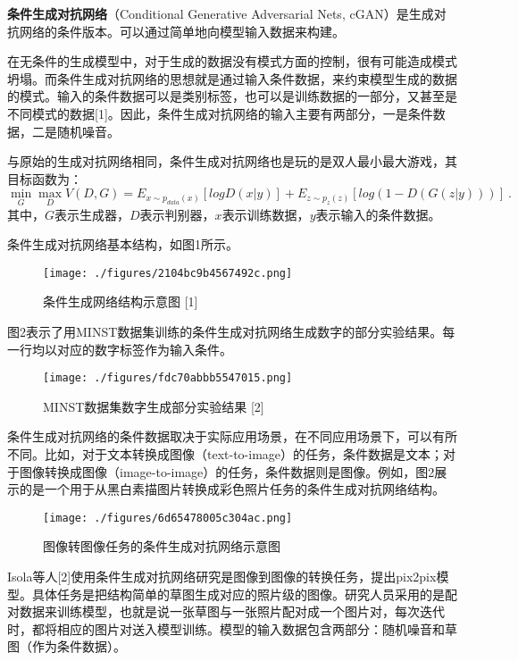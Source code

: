 

\textbf{条件生成对抗网络}（Conditional Generative Adversarial Nets, cGAN）是生成对抗网络的条件版本。可以通过简单地向模型输入数据来构建。

在无条件的生成模型中，对于生成的数据没有模式方面的控制，很有可能造成模式坍塌。而条件生成对抗网络的思想就是通过输入条件数据，来约束模型生成的数据的模式。输入的条件数据可以是类别标签，也可以是训练数据的一部分，又甚至是不同模式的数据[1]。因此，条件生成对抗网络的输入主要有两部分，一是条件数据，二是随机噪音。

与原始的生成对抗网络相同，条件生成对抗网络也是玩的是双人最小最大游戏，其目标函数为：
\begin{equation}
\mathop{\min}\limits_G \mathop {\max }\limits_D V(D,G)=E_{x\sim p_{data}(x)}[logD(x|y)]+E_{z\sim p_z(z)}[log(1-D(G(z|y)))]~.
\end{equation}
其中，$G$表示生成器，$D$表示判别器，$x$表示训练数据，$y$表示输入的条件数据。

条件生成对抗网络基本结构，如图1所示。
\begin{figure}[ht]
\centering
\texttt{[image: ./figures/2104bc9b4567492c.png]}
\caption{条件生成网络结构示意图 [1]} \label{fig_cGAN_1}
\end{figure}

图2表示了用MINST数据集训练的条件生成对抗网络生成数字的部分实验结果。每一行均以对应的数字标签作为输入条件。
\begin{figure}[ht]
\centering
\texttt{[image: ./figures/fdc70abbb5547015.png]}
\caption{MINST数据集数字生成部分实验结果 [2]} \label{fig_cGAN_2}
\end{figure}

条件生成对抗网络的条件数据取决于实际应用场景，在不同应用场景下，可以有所不同。比如，对于文本转换成图像（text-to-image）的任务，条件数据是文本；对于图像转换成图像（image-to-image）的任务，条件数据则是图像。例如，图2展示的是一个用于从黑白素描图片转换成彩色照片任务的条件生成对抗网络结构。

\begin{figure}[ht]
\centering
\texttt{[image: ./figures/6d65478005c304ac.png]}
\caption{图像转图像任务的条件生成对抗网络示意图} \label{fig_cGAN_3}
\end{figure}

Isola等人[2]使用条件生成对抗网络研究是图像到图像的转换任务，提出pix2pix模型。具体任务是把结构简单的草图生成对应的照片级的图像。研究人员采用的是配对数据来训练模型，也就是说一张草图与一张照片配对成一个图片对，每次迭代时，都将相应的图片对送入模型训练。模型的输入数据包含两部分：随机噪音和草图（作为条件数据）。

